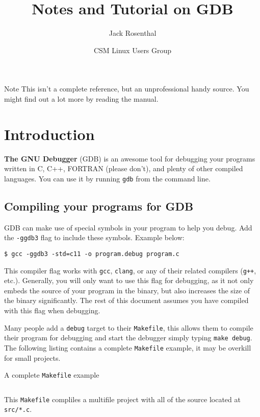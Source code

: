 \documentclass[11pt]{article}
\title{\bfseries\sffamily Notes and Tutorial on GDB}
\author{Jack Rosenthal}
\date{CSM Linux Users Group}
\begin{document}
\maketitle
\begin{infobox}{Note}
    This isn't a complete reference, but an unprofessional handy source. You
    might find out a lot more by reading the manual.
\end{infobox}
\tableofcontents
\section{Introduction}
\textbf{The GNU Debugger} (GDB) is an awesome tool for debugging your programs written
in C, C++, FORTRAN (please don't), and plenty of other compiled languages. You
can use it by running \texttt{gdb} from the command line.

\subsection{Compiling your programs for GDB}
GDB can make use of special symbols in your program to help you debug. Add the
\texttt{-ggdb3} flag to include these symbols. Example below:
\begin{termbox}
\begin{verbatim}
$ gcc -ggdb3 -std=c11 -o program.debug program.c
\end{verbatim}
\end{termbox}
This compiler flag works with \texttt{gcc}, \texttt{clang}, or any of their
related compilers (\texttt{g++}, etc.). Generally, you will only want to use
this flag for debugging, as it not only embeds the source of your program in
the binary, but also increases the size of the binary significantly. The rest
of this document assumes you have compiled with this flag when debugging.

Many people add a \texttt{debug} target to their \texttt{Makefile}, this allows
them to compile their program for debugging and start the debugger simply
typing \texttt{make debug}. The following listing contains a complete
\texttt{Makefile} example, it may be overkill for small projects.
\begin{listingbox}{A complete \texttt{Makefile} example}
    \inputminted{Makefile}{MakefileExample}
\end{listingbox}
This \texttt{Makefile} compliles a multifile project with all of the source
located at \texttt{src/*.c}.

\clearpage
\end{document}

